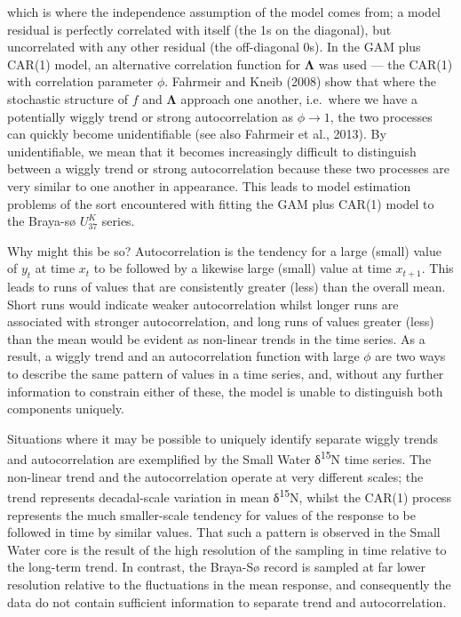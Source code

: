 \documentclass[12pt,]{article}
\newcommand{\uk}{\ensuremath{\mathit{U}^{\mathit{K}}_{\mathup{37}}}}
\begin{document}
which is where the independence assumption of the model comes from; a
model residual is perfectly correlated with itself (the 1s on the
diagonal), but uncorrelated with any other residual (the off-diagonal
0s). In the GAM plus CAR(1) model, an alternative correlation function
for \(\boldsymbol{\Lambda}\) was used --- the CAR(1) with correlation
parameter \(\phi\). Fahrmeir and Kneib (2008) show that where the
stochastic structure of \(f\) and \(\boldsymbol{\Lambda}\) approach one
another, i.e.~where we have a potentially wiggly trend or strong
autocorrelation as \(\phi \rightarrow 1\), the two processes can quickly
become unidentifiable (see also Fahrmeir et al., 2013). By
unidentifiable, we mean that it becomes increasingly difficult to
distinguish between a wiggly trend or strong autocorrelation because
these two processes are very similar to one another in appearance. This
leads to model estimation problems of the sort encountered with fitting
the GAM plus CAR(1) model to the Braya-sø \uk{} series.

Why might this be so? Autocorrelation is the tendency for a large
(small) value of \(y_t\) at time \(x_t\) to be followed by a likewise
large (small) value at time \(x_{t+1}\). This leads to runs of values
that are consistently greater (less) than the overall mean. Short runs
would indicate weaker autocorrelation whilst longer runs are associated
with stronger autocorrelation, and long runs of values greater (less)
than the mean would be evident as non-linear trends in the time series.
As a result, a wiggly trend and an autocorrelation function with large
\(\phi\) are two ways to describe the same pattern of values in a time
series, and, without any further information to constrain either of
these, the model is unable to distinguish both components uniquely.

Situations where it may be possible to uniquely identify separate wiggly
trends and autocorrelation are exemplified by the Small Water
δ\textsuperscript{15}N time series. The non-linear trend and the
autocorrelation operate at very different scales; the trend represents
decadal-scale variation in mean δ\textsuperscript{15}N, whilst the
CAR(1) process represents the much smaller-scale tendency for values of
the response to be followed in time by similar values. That such a
pattern is observed in the Small Water core is the result of the high
resolution of the sampling in time relative to the long-term trend. In
contrast, the Braya-Sø record is sampled at far lower resolution
relative to the fluctuations in the mean response, and consequently the
data do not contain sufficient information to separate trend and
autocorrelation.
\end{document}
